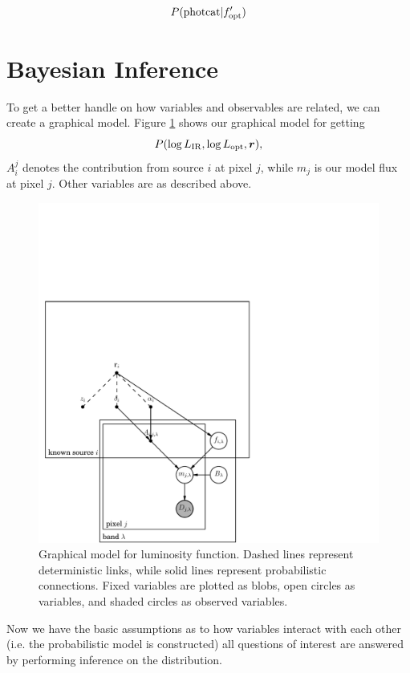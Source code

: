 \documentclass[a4paper,11pt]{article}
\begin{document}
$$P({\rm photcat}| f_{\rm opt}^\prime)$$

\section{Bayesian Inference}
To get a better handle on how variables and observables are related, we can create a graphical model. Figure \ref{fig:graph_model} shows our graphical model for getting $$P(\log L_{\rm IR},\log L_{\rm opt},\bm{r}),$$
$A_i^j$ denotes the contribution from source $i$ at pixel $j$, while $m_j$ is our model flux at pixel $j$. Other variables are as described above.

\begin{figure}
\centering
\includegraphics{graphical_model.pdf}
\caption{Graphical model for luminosity function. Dashed lines represent deterministic links, while solid lines represent probabilistic connections. Fixed variables are plotted as blobs, open circles as variables, and shaded circles as observed variables.}\label{fig:graph_model}
\end{figure}

Now we have the basic assumptions as to how variables interact with each other (i.e. the probabilistic model is constructed) all questions of interest are answered by performing inference on the distribution. 
\end{document}
